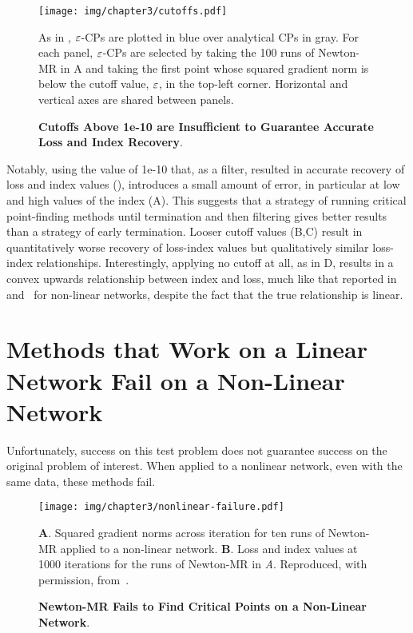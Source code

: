 \documentclass[../../thesis.tex]{subfiles}
\begin{document}
\begin{figure}[h]
	\begin{center}
		\texttt{[image: img/chapter3/cutoffs.pdf]}
	\end{center}
	\caption{\textbf{Cutoffs Above 1e-10 are Insufficient to Guarantee
	Accurate Loss and Index Recovery}.}{%
	As in ,
	$\varepsilon$-CPs are plotted in blue
	over analytical CPs in gray.
	For each panel,
	$\varepsilon$-CPs are selected by taking
	the 100 runs of Newton-MR in A
	and taking the first point whose squared gradient norm is below
	the cutoff value, $\varepsilon$, in the top-left corner.
	Horizontal and vertical axes are shared between panels.
}
\end{figure}

Notably, using the value of 1e-10
that, as a filter,
resulted in accurate recovery of loss and index values
(),
introduces a small amount of error,
in particular at low and high values of the index
(A).
This suggests that
a strategy of running
critical point-finding methods until termination
and then filtering
gives better results than
a strategy of early termination.
Looser cutoff values
(B,C)
result in quantitatively worse
recovery of loss-index values
but qualitatively similar loss-index relationships.
Interestingly, applying no cutoff at all,
as in D,
results in a convex upwards relationship
between index and loss,
much like that reported in~\cite{dauphin2014} and~\cite{pennington2017}
for non-linear networks,
despite the fact that the true relationship is linear.


\section{Methods that Work on a Linear Network Fail on a Non-Linear Network}%

Unfortunately,
success on this test problem does not guarantee
success on the original problem of interest.
When applied to a nonlinear network,
even with the same data,
these methods fail.

\begin{figure}[h]
	\begin{center}
		\texttt{[image: img/chapter3/nonlinear-failure.pdf]}
	\end{center}
	\caption{\textbf{Newton-MR Fails to Find Critical Points
	on a Non-Linear Network}.}
	\textbf{A}. Squared gradient norms across iteration
	for ten runs of Newton-MR applied to a non-linear network.
	\textbf{B}. Loss and index values at 1000 iterations
	for the runs of Newton-MR in \emph{A}.
	Reproduced, with permission,
	from~\cite{frye2020}.
\end{figure}
\end{document}
